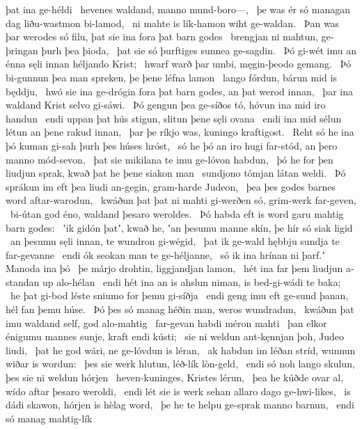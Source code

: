 þat ina ge-héldi \hld\ hevenes waldand,
manno mund-boro—, \hld\ þe was ér só managan dag
liðu-wastmon bi-lamod, \hld\ ni mahte is lík-hamon
wiht ge-waldan. \hld\ Þan was þar werodes só filu,
þat sie ina fora þat barn godes \hld\ brengjan ni mahtun,
ge-þringan þurh þea þioda, \hld\ þat sie só þurftiges
sunnea ge-sagdin. \hld\ Þó gi-wét imu an énna sęli innan
héljando Krist; \hld\ hwarf warð þar umbi,
męgin-þeodo gemang. \hld\ Þó bi-gunnun þea man spreken,
þe þene léfna lamon \hld\ lango fórdun,
bárun mid is będdju, \hld\ hwó sie ina ge-drógin fora þat barn godes,
an þat werod innan, \hld\ þar ina waldand Krist
selvo gi-sáwi. \hld\ Þó gengun þea ge-síðos tó,
hóvun ina mid iro handun \hld\ endi uppan þat hús stigun,
slitun þene sęli ovana \hld\ endi ina mid sélun létun
an þene rakud innan, \hld\ þar þe ríkjo was,
kuningo kraftigost. \hld\ Reht só he ina þó kuman gi-sah
þurh þes húses hróst, \hld\ só he þó an iro hugi far-stód,
an þero manno mód-sevon, \hld\ þat sie mikilana te imu
ge-lóvon habdun, \hld\ þó he for þen liudjun sprak,
kwað þat he þene siakon man \hld\ sundjono tómjan
látan weldi. \hld\ Þó sprákun im eft þea liudi an-gegin,
gram-harde Judeon, \hld\ þea þes godes barnes
word aftar-warodun, \hld\ kwáðun þat þat ni mahti gi-werðen só,
grim-werk far-geven, \hld\ bi-útan god éno,
waldand þesaro weroldes. \hld\ Þó habda eft is word garu
mahtig barn godes: \hld\ ʽik gidón þatʼ, kwað he, ʽan þesumu manne skín,
þe hír só siak ligid \hld\ an þesumu sęli innan,
te wundron gi-wégid, \hld\ þat ik ge-wald hębbju
sundja te far-gevanne \hld\ endi ók seokan man
te ge-héljanne, \hld\ só ik ina hrínan ni þarf.ʼ
Manoda ina þó \hld\ þe márjo drohtin,
liggjandjan lamon, \hld\ hét ina far þem liudjun a-standan
up alo-hélan \hld\ endi hét ina an is ahslun niman,
is bed-gi-wádi te baka; \hld\ he þat gi-bod léste
sniumo for þemu gi-síðja \hld\ endi geng imu eft ge-sund þanan,
hél fan þemu húse. \hld\ Þó þes só manag héðin man,
weros wundradun, \hld\ kwáðun þat imu waldand self,
god alo-mahtig \hld\ far-gevan habdi
méron mahti \hld\ þan elkor énigumu mannes sunje,
kraft endi kústi; \hld\ sie ni weldun ant-kęnnjan þoh,
Judeo liudi, \hld\ þat he god wári,
ne ge-lóvdun is léran, \hld\ ak habdun im léðan stríd,
wunnun wiðar is wordun: \hld\ þes sie werk hlutun,
léð-lík lòn-geld, \hld\ endi só noh lango skulun,
þes sie ni weldun hórjen \hld\ heven-kuninges,
Kristes lérun, \hld\ þea he kúðde ovar al,
wído aftar þesaro weroldi, \hld\ endi lét sie is werk sehan
allaro dago ge-hwi-likes, \hld\ is dádi skawon,
hórjen is hèlag word, \hld\ þe he te helpu ge-sprak
manno barnun, \hld\ endi só manag mahtig-lík
